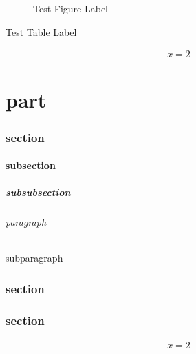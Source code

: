 
\begin{figure}
  \caption{Test Figure Label} \label{fig:figure}
\end{figure}

\begin{table}
   \label{tab:subtable}
  \caption{Test Table Label} \label{tab:table}
\end{table}

\begin{align}
  x = 2 \label{eq:equation}
\end{align}

\part{part} \label{sec:part}
\section{section} \label{sec:section}
\subsection{subsection} \label{sec:subsection}
\subsubsection{subsubsection} \label{sec:subsubsection}
\paragraph{paragraph} \label{sec:paragraph}
\subparagraph{subparagraph} \label{sec:subparagraph}
 \label{sec:minisec}


\section[Test]{section} \label{sec:sectionwithoption}
\section*{section} \label{sec:sectionwithstar}

\begin{align}
  x = 2 \label{eq:section}
\end{align}
